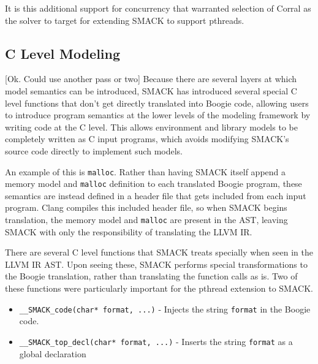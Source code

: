 It is this additional support for concurrency that warranted selection
of Corral as the solver to target for extending SMACK to support pthreads.

\subsection{C Level Modeling}
[Ok.  Could use another pass or two]
Because there are several layers at which model semantics can be
introduced, SMACK has introduced several special C level functions 
that don't get directly translated into Boogie code, allowing users to
introduce program semantics at the lower levels of the modeling
framework by writing code at the C level.  This allows environment and
library models to be completely written as C input programs, which
avoids modifying SMACK's source code directly to implement such
models.

An example of this is \lstinline|malloc|.  Rather than having SMACK
itself append a memory model and \lstinline|malloc| definition to each
translated Boogie program, these semantics are instead defined in a
header file that gets included from each input program.  Clang
compiles this included header file, so when SMACK begins translation,
the memory model and \lstinline|malloc| are present in the AST,
leaving SMACK with only the responsibility of translating the LLVM IR.

There are several C level functions that SMACK treats specially when
seen in the LLVM IR AST.  Upon seeing these, SMACK performs special
transformations to the Boogie translation, rather than translating the
function calls as is.  Two of these functions were particularly
important for the pthread extension to SMACK. 


\begin{itemize}
\item \lstinline|__SMACK_code(char* format, ...)| - Injects the string
  \lstinline|format| in the Boogie code.
\item \lstinline|__SMACK_top_decl(char* format, ...)| - Inserts the
  string \lstinline|format| as a global declaration
\end{itemize}

